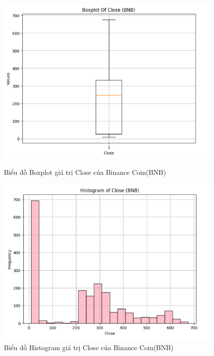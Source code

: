 \documentclass[conference]{IEEEtran}
\begin{document}
\begin{figure}[H]
    \centering
    \begin{minipage}{0.23\textwidth}
    \centering
    \includegraphics[width=1\textwidth]{Figure/BNBBoxplot.png}
    \caption{Biểu đồ Boxplot giá trị Close của Binance Coin(BNB)}
    \label{fig:1}
    \end{minipage}
    \hfill
    \begin{minipage}{0.23\textwidth}
    \centering
    \includegraphics[width=1\textwidth]{Figure/BNBHistogram.png}
    \caption{Biểu đồ Histogram giá trị Close của Binance Coin(BNB)}
    \label{fig:2}
    \end{minipage}
\end{figure}
\end{document}
